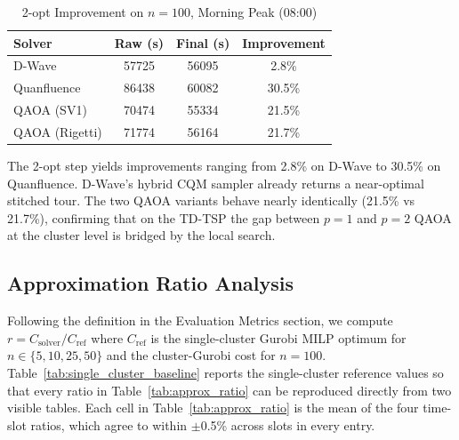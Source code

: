 \documentclass[conference]{IEEEtran}
\begin{document}
\begin{table}[htbp]
\caption{2-opt Improvement on $n=100$, Morning Peak (08:00)}
\begin{center}
\begin{tabular}{|l|c|c|c|}
\hline
\textbf{Solver} & \textbf{Raw (s)} & \textbf{Final (s)} & \textbf{Improvement} \\
\hline
D-Wave         & 57725 & 56095 & 2.8\%  \\
\hline
Quanfluence    & 86438 & 60082 & 30.5\% \\
\hline
QAOA (SV1)     & 70474 & 55334 & 21.5\% \\
\hline
QAOA (Rigetti) & 71774 & 56164 & 21.7\% \\
\hline
\end{tabular}
\label{tab:two_opt}
\end{center}
\end{table}

The 2-opt step yields improvements ranging from 2.8\% on D-Wave to 30.5\% on Quanfluence. D-Wave's hybrid CQM sampler already returns a near-optimal stitched tour. The two QAOA variants behave nearly identically (21.5\% vs 21.7\%), confirming that on the TD-TSP the gap between $p=1$ and $p=2$ QAOA at the cluster level is bridged by the local search. 


\subsection{Approximation Ratio Analysis}
\label{sec:approx_ratio}

Following the definition in the Evaluation Metrics section, we compute $r = C_{\text{solver}} / C_{\text{ref}}$ where $C_{\text{ref}}$ is the single-cluster Gurobi MILP optimum for $n \in \{5, 10, 25, 50\}$ and the cluster-Gurobi cost for $n = 100$. Table~\ref{tab:single_cluster_baseline} reports the single-cluster reference values so that every ratio in Table~\ref{tab:approx_ratio} can be reproduced directly from two visible tables. Each cell in Table~\ref{tab:approx_ratio} is the mean of the four time-slot ratios, which agree to within $\pm$0.5\% across slots in every entry.
\end{document}
